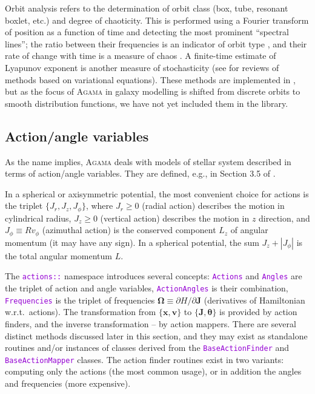 \documentclass[12pt]{article}
\newcommand{\Agama}{\textsc{Agama}\xspace}
\newcommand{\ttt}[1]{\textcolor{darkviolet}{\texttt{#1}}}
\renewcommand{\d}{\partial}
\newcommand{\bv}{\boldsymbol{v}}
\newcommand{\bx}{\boldsymbol{x}}
\newcommand{\bJ}{\boldsymbol{J}}
\newcommand{\bt}{\boldsymbol{\theta}}
\begin{document}
Orbit analysis refers to the determination of orbit class (box, tube, resonant boxlet, etc.) and degree of chaoticity. This is performed using a Fourier transform of position as a function of time and detecting the most prominent ``spectral lines''; the ratio between their frequencies is an indicator of orbit type \cite{BinneySpergel1984, CarpinteroAguilar1998}, and their rate of change with time is a measure of chaos \cite{ValluriMerritt1998}. A finite-time estimate of Lyapunov exponent is another measure of stochasticity (see \cite{Carpintero2014, Skokos2010} for reviews of methods based on variational equations). These methods are implemented in \cite{Vasiliev2013}, but as the focus of \Agama in galaxy modelling is shifted from discrete orbits to smooth distribution functions, we have not yet included them in the library.


\subsection{Action/angle variables}  \label{sec:ActionAngle}

As the name implies, \Agama deals with models of stellar system described in terms of action/angle variables. They are defined, e.g., in Section 3.5 of \cite{BinneyTremaine}.

In a spherical or axisymmetric potential, the most convenient choice for actions is the triplet $\{J_r, J_z, J_\phi\}$, where $J_r\ge 0$ (radial action) describes the motion in cylindrical radius, $J_z\ge 0$ (vertical action) describes the motion in $z$ direction, and $J_\phi \equiv R v_\phi$ (azimuthal action) is the conserved component $L_z$ of angular momentum (it may have any sign). In a spherical potential, the sum $J_z + |J_\phi|$ is the total angular momentum $L$.

The \ttt{actions::} namespace introduces several concepts: \ttt{Actions} and \ttt{Angles} are the triplet of action and angle variables, \ttt{ActionAngles} is their combination, \ttt{Frequencies} is the triplet of frequencies $\boldsymbol{\Omega}\equiv \d H/\d\bJ$ (derivatives of Hamiltonian w.r.t.\ actions). 
The transformation from $\{\bx,\bv\}$ to $\{\bJ,\bt\}$ is provided by action finders, and the inverse transformation -- by action mappers. There are several distinct methods discussed later in this section, and they may exist as standalone routines and/or instances of classes derived from the \ttt{BaseActionFinder} and \ttt{BaseActionMapper} classes. The action finder routines exist in two variants: computing only the actions (the most common usage), or in addition the angles and frequencies (more expensive).
\end{document}
